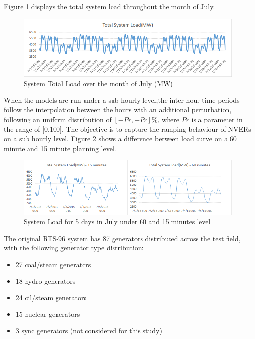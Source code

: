 \documentclass[12pt,LUDisStyle,twosided]{book}
\begin{document}
Figure \ref{fig:totalSystemLoadJuly} displays the total system load throughout the month of July.

\begin{figure}[h!] 
  \includegraphics[width=\textwidth,keepaspectratio]{totalSystemLoadJuly.png}
  \caption{System Total Load over the month of July (MW)}
  \label{fig:totalSystemLoadJuly}
\end{figure}

When the models are run under a sub-hourly level,the inter-hour time periods follow the interpolation between the hours with an additional perturbation, following an uniform distribution of $[-Pr,+Pr]\%$, where $Pr$ is a parameter in the range of [0,100]. The objective is to capture the ramping behaviour of NVERs on a sub hourly level. Figure \ref{fig:perturbationDifference} shows a difference between load curve on a 60 minute and 15 minute planning level. 

\begin{figure}[h!] 
  \includegraphics[width=\textwidth,keepaspectratio]{perturbationDifference.png}
  \caption{System Load for 5 days in July under 60 and 15 minutes level}
  \label{fig:perturbationDifference}
\end{figure}

The original RTS-96 system has 87 generators distributed across the test field, with the following generator type distribution:

\begin{itemize}
\item 27 coal/steam generators
\item 18 hydro generators
\item 24 oil/steam generators
\item 15 nuclear generators
\item 3 sync generators (not considered for this study)
\end{itemize}
\end{document}

